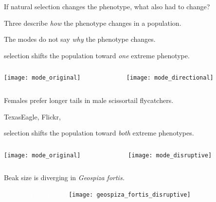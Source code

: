 \documentclass[t]{beamer}
\begin{document}
\begin{frame}[t]{If natural selection changes the phenotype, what also had to change?}

\hangpara Three  describe \emph{how} the phenotype changes in a population.

\hangpara The modes do not say \emph{why} the phenotype changes.

\end{frame}
%
\begin{frame}{ selection shifts the population toward \emph{one} extreme phenotype.}
	\centering
	\begin{columns}[T]
		\begin{column}{0.5\textwidth}
			\centering
			\texttt{[image: mode\_original]}
		\end{column}
		\begin{column}{0.5\textwidth}
			\pause\texttt{[image: mode\_directional]}
		\end{column}
	\end{columns}
\end{frame}
%
{
\begin{frame}[b]{Females prefer longer tails in male scissortail flycatchers.}

	\hfill \tiny TexasEagle, Flickr, 

\end{frame}
}
%
\begin{frame}{ selection shifts the population toward \emph{both} extreme phenotypes.}
	\centering
	\begin{columns}[T]
		\begin{column}{0.5\textwidth}
			\centering
			\texttt{[image: mode\_original]}
		\end{column}
		\begin{column}{0.5\textwidth}
			\texttt{[image: mode\_disruptive]}
		\end{column}
	\end{columns}
\end{frame}
%
{
\begin{frame}[b]{Beak size is diverging in \textit{Geospiza fortis.}}

	\tiny\textcolor{white}{Mark Putney, Flickr, } \pause\hfill\texttt{[image: geospiza\_fortis\_disruptive]}

\end{frame}
}
\end{document}
